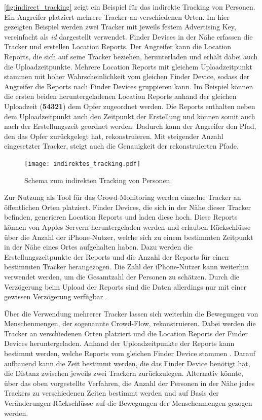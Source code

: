 \autoref{fig:indirect_tracking} zeigt ein Beispiel für das indirekte Tracking von Personen.
Ein Angreifer platziert mehrere Tracker an verschiedenen Orten.
Im hier gezeigten Beispiel werden zwei Tracker mit jeweils festem Advertising Key, vereinfacht als \textit{id} dargestellt verwendet.
Finder Devices in der Nähe erfassen die Tracker und erstellen Location Reports.
Der Angreifer kann die Location Reports, die sich auf seine Tracker beziehen, herunterladen und erhält dabei auch die Uploadzeitpunkte.
Mehrere Location Reports mit gleichem Uploadzeitpunkt stammen mit hoher Wahrscheinlichkeit vom gleichen Finder Device, sodass der Angreifer die Reports nach Finder Devices gruppieren kann.
Im Beispiel können die ersten beiden heruntergeladenen Location Reports anhand der gleichen Uploadzeit (\textbf{54321}) dem Opfer zugeordnet werden.
Die Reports enthalten neben dem Uploadzeitpunkt auch den Zeitpunkt der Erstellung und können somit auch nach der Erstellungszeit geordnet werden.
Dadurch kann der Angreifer den Pfad, den das Opfer zurückgelegt hat, rekonstruieren.
Mit steigender Anzahl eingesetzter Tracker, steigt auch die Genauigkeit der rekonstruierten Pfade.
\begin{figure}[ht]
  \centering
  \texttt{[image: indirektes\_tracking.pdf]}
  \caption{Schema zum indirekten Tracking von Personen.}
  \label{fig:indirect_tracking}
\end{figure}

Zur Nutzung als Tool für das Crowd-Monitoring werden einzelne Tracker an öffentlichen Orten platziert.
Finder Devices, die sich in der Nähe dieser Tracker befinden, generieren Location Reports und laden diese hoch.
Diese Reports können von Apples Servern heruntergeladen werden und erlauben Rückschlüsse über die Anzahl der iPhone-Nutzer, welche sich zu einem bestimmten Zeitpunkt in der Nähe eines Ortes aufgehalten haben.
Dazu werden die Erstellungszeitpunkte der Reports und die Anzahl der Reports für einen bestimmten Tracker herangezogen.
Die Zahl der iPhone-Nutzer kann weiterhin verwendet werden, um die Gesamtzahl der Personen zu schätzen.
Durch die Verzögerung beim Upload der Reports sind die Daten allerdings nur mit einer gewissen Verzögerung verfügbar \cite{Tonetto_FindMy}.

Über die Verwendung mehrerer Tracker lassen sich weiterhin die Bewegungen von Menschenmengen, der sogenannte Crowd-Flow, rekonstruieren.
Dabei werden die Tracker an verschiedenen Orten platziert und die Location Reports der Finder Devices heruntergeladen.
Anhand der Uploadzeitpunkte der Reports kann bestimmt werden, welche Reports vom gleichen Finder Device stammen \cite{Tonetto_FindMy}.
Darauf aufbauend kann die Zeit bestimmt werden, die das Finder Device benötigt hat, die Distanz zwischen jeweils zwei Trackern zurückzulegen.
Alternativ könnte, über das oben vorgestellte Verfahren, die Anzahl der Personen in der Nähe jedes Trackers zu verschiedenen Zeiten bestimmt werden und auf Basis der Veränderungen Rückschlüsse auf die Bewegungen der Menschenmengen gezogen werden.


